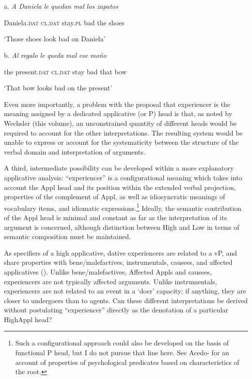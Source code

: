 \documentclass[output=paper,modfonts,nonflat]{langsci/langscibook}
\begin{document}
\ea%
    \label{ex:key:19}
    \gll\\
        \\
    \glt
    \z

           a.   \textit{A} \textit{Daniela}   \textit{le}   \textit{quedan} \textit{mal}  \textit{los} \textit{zapatos} 

    Daniela.\textsc{dat} \textsc{cl.dat} stay.\textsc{pl} bad  the shoes

    ‘Those shoes look bad on Daniela’

  b.   \textit{Al} \textit{regalo}       \textit{le}   \textit{queda} \textit{mal}  \textit{ese} \textit{moño}

    the present.\textsc{dat} \textsc{cl.dat} stay bad  that bow 

    ‘That bow looks bad on the present’          

Even more importantly, a problem with the proposal that experiencer is the meaning assigned by a dedicated applicative (or P) head is that, as noted by Wechsler (this volume), an unconstrained quantity of different heads would be required to account for the other interpretations. The resulting system would be unable to express or account for the systematicity between the structure of the verbal domain and interpretation of arguments.   

A third, intermediate possibility can be developed within a more explanatory applicative analysis: “experiencer” is a configurational meaning which takes into account the Appl head and its position within the extended verbal projection, properties of the complement of Appl, as well as idiosyncratic meanings of vocabulary items, and idiomatic expressions.\footnote{Such a configurational approach could also be developed on the basis of  functional P head, but I do not pursue that line here. See Acedo-\citet{MatellánMateu2015} for an account of properties of psychological predicates based on characteristics of the root.}  Ideally, the semantic contribution of the Appl head is minimal and constant as far as the interpretation of its argument is concerned, although  distinction between High and Low in terms of semantic composition must be maintained.

As specifiers of a high applicative, dative experiencers are related to a vP, and share properties with bene/malefactives, instrumentals, causees, and affected applicatives (). Unlike bene/malefactives, Affected Appls and causees, experiencers are not typically affected arguments. Unlike instrumentals, experiencers are not related to an event in a ‘doer’ capacity; if anything, they are closer to undergoers than to agents. Can these different interpretations be derived without postulating “experiencer” directly as the denotation of a particular HighAppl head?
\end{document}
